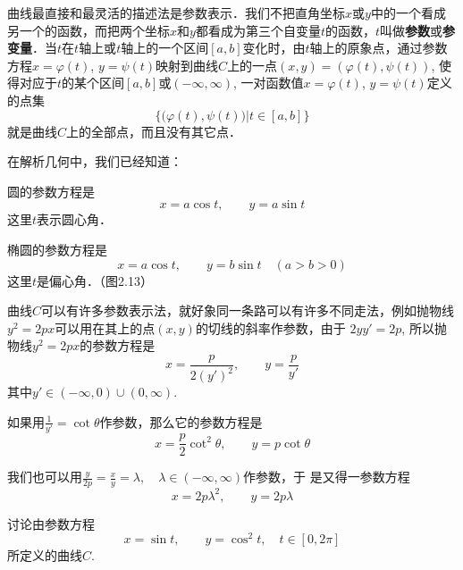曲线最直接和最灵活的描述法是参数表示．我们不把直角坐标$x$或$y$中的一个看成另一个的函数，而把两个坐标$x$和$y$都看成为第三个自变量$t$的函数，$t$叫做\textbf{参数}或\textbf{参变量}．当$t$在$t$轴上或$t$轴上的一个区间$[a,b]$变化时，由$t$轴上的原象点，通过参数方程$x=\varphi(t)$, $y=\psi(t)$映射到曲线$C$上的一点$(x,y)=(\varphi(t),\psi(t))$, 使得对应于$t$的某个区间$[a,b]$或$(-\infty, \infty)$, 一对函数值$x=\varphi(t)$, $y=\psi(t)$定义的点集
$$\Big\{\big(\varphi(t), \psi(t)\big)\Big|t\in [a,b]\Big\}$$
就是曲线$C$上的全部点，而且没有其它点．

在解析几何中，我们已经知道：

圆的参数方程是
\[x=a\cos t,\qquad y=a\sin t\]
这里$t$表示圆心角．

椭圆的参数方程是
\[x=a\cos t,\qquad y=b\sin t\quad (a>b>0)\]
这里$t$是偏心角．（图2.13）

\begin{figure}[htp]
    \centering
{}
    \caption{}
\end{figure}

曲线$C$可以有许多参数表示法，就好象同一条路可以有许多不同走法，例如抛物线$y^2=2px$可以用在其上的点$(x,y)$的切线的斜率作参数，由于
$2yy'=2p$, 所以抛物线$y^2=2px$的参数方程是
\[x=\frac{p}{2(y')^2},\qquad y=\frac{p}{y'}\]
其中$y'\in (-\infty,0)\cup (0, \infty)$.

如果用$\frac{1}{y'}=\cot\theta$作参数，那么它的参数方程是
\[x=\frac{p}{2}\cot^2 \theta,\qquad y=p\cot\theta\]

我们也可以用$\frac{y}{2p}=\frac{x}{y}=\lambda,\quad \lambda\in (-\infty, \infty)$作参数，于
是又得一参数方程
\[x=2p\lambda^2,\qquad y=2p\lambda\]


\begin{example}
讨论由参数方程
\[x=\sin t,\qquad y=\cos^2 t,\quad t\in[0,2\pi]\]
所定义的曲线$C$.
\end{example}

